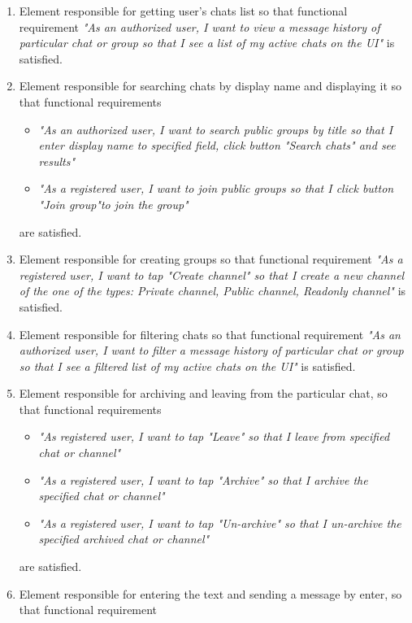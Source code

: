 \begin{enumerate}
    \item Element responsible for getting user's chats list so that functional requirement \textit{"As an authorized user,
        I want to view a message history of particular chat or group so that I see a list of my active chats on the UI"}
    is satisfied.
    \item Element responsible for searching chats by display name and displaying it so that functional requirements
    \begin{itemize}
        \item \textit{"As an authorized user, I want to search public groups by title so that I enter display name to specified field,
            click button "Search chats" and see results"}
        \item \textit{"As a registered user, I want to join public groups so that I click button "Join group"to join the group"}
    \end{itemize}
    are satisfied.
    \item Element responsible for creating groups so that functional requirement
    \textit{"As a registered user, I want to tap "Create channel" so that I create a new channel of the one of the types:
    Private channel, Public channel, Readonly channel"} is satisfied.
    \item Element responsible for filtering chats so that functional requirement \textit{"As an authorized user,
        I want to filter a message history of particular chat or group so that I see a filtered list of my active
        chats on the UI"} is satisfied.
    \item Element responsible for archiving and leaving from the particular chat, so that functional requirements
    \begin{itemize}
        \item \textit{"As registered user, I want to tap "Leave" so that I leave from specified chat or channel"}
        \item \textit{"As a registered user, I want to tap "Archive" so that I archive the specified chat or channel"}
        \item \textit{"As a registered user, I want to tap "Un-archive" so that I un-archive the specified archived chat or channel"}
    \end{itemize}
    are satisfied.
    \item Element responsible for entering the text and sending a message by enter, so that functional requirement

\end{enumerate}

